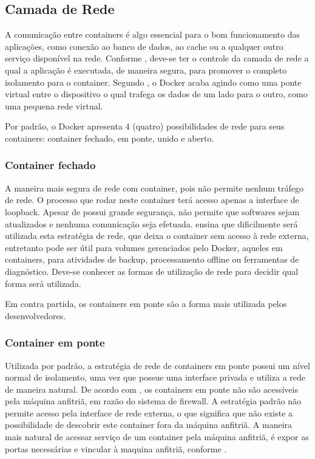 \documentclass[
	12pt,				%
	openright,			%
	oneside,			%
	a4paper,			%
	chapter=TITLE,		%
	section=TITLE,		%
	english,			%
	french,				%
	spanish,			%
	brazil				%
	]{abntex2}
\begin{document}
\subsection{Camada de Rede}

A comunicação entre containers é algo essencial para o bom funcionamento das aplicações, como conexão ao banco de dados, ao cache ou a qualquer outro serviço disponível na rede. Conforme , deve-se ter o controle da camada de rede a qual a aplicação é executada, de maneira segura, para promover o completo isolamento para o container. Segundo , o Docker acaba agindo como uma ponte virtual entre o dispositivo o qual trafega os dados de um lado para o outro, como uma pequena rede virtual.

Por padrão, o Docker apresenta 4 (quatro) possibilidades de rede para seus containers: container fechado, em ponte, unido e aberto.

\subsubsection{Container fechado}

A maneira mais segura de rede com container, pois não permite nenhum tráfego de rede. O processo que rodar neste container terá acesso apenas a interface de loopback. Apesar de possui grande segurança, não permite que softwares sejam atualizados e nenhuma comunicação seja efetuada.  ensina que dificilmente será utilizada esta estratégia de rede, que deixa o container sem acesso à rede externa, entretanto pode ser útil para volumes gerenciados pelo Docker, aqueles em containers, para atividades de backup, processamento offline ou ferramentas de diagnóstico. Deve-se conhecer as formas de utilização de rede para decidir qual forma será utilizada.

Em contra partida, os containers em ponte são a forma mais utilizada pelos desenvolvedores.

\subsubsection{Container em ponte}

Utilizada por padrão, a estratégia de rede de containers em ponte possui um nível normal de isolamento, uma vez que possue uma interface privada e utiliza a rede de maneira natural. De acordo com , os containers em ponte não são acessíveis pela máquina anfitriã, em razão do sistema de firewall. A estratégia padrão não permite acesso pela interface de rede externa, o que significa que não existe a possibilidade de descobrir este container fora da máquina anfitriã. A maneira mais natural de acessar serviço de um container pela máquina anfitriã, é expor as portas necessárias e vincular à maquina anfitriã, conforme .
\end{document}
